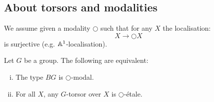 \subsection{About torsors and modalities}

We assume given a modality $\bigcirc$ such that for any $X$ the localisation:
\[X\to \bigcirc X\]
is surjective (e.g. $\mathbb{A}^1$-localisation).

\begin{proposition}\label{torsor-and-modalities}
Let $G$ be a group. The following are equivalent:
\begin{enumerate}[(i)]
\item The type $BG$ is $\bigcirc$-modal.
\item For all $X$, any $G$-torsor over $X$ is $\bigcirc$-étale.
\end{enumerate}
\end{proposition}

